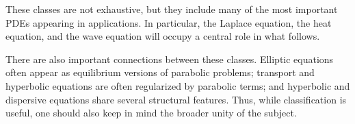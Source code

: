 These classes are not exhaustive, but they include many of the most important PDEs appearing in applications. In particular, the Laplace equation, the heat equation, and the wave equation will occupy a central role in what follows.

There are also important connections between these classes. Elliptic equations often appear as equilibrium versions of parabolic problems; transport and hyperbolic equations are often regularized by parabolic terms; and hyperbolic and dispersive equations share several structural features. Thus, while classification is useful, one should also keep in mind the broader unity of the subject.

